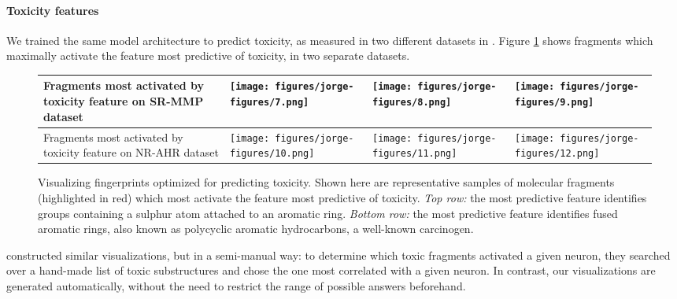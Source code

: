 \documentclass{article}
\newcommand{\citet}{\cite}
\begin{document}
\paragraph{Toxicity features}
We trained the same model architecture to predict toxicity, as measured in two different datasets in \citet{tox21}.
Figure \ref{fig:learned features toxicity} shows fragments which maximally activate the feature most predictive of toxicity, in two separate datasets.
\newcommand{\molfeaturetox}[2]{\texttt{[image: ../../DeepMoleculesData/experiments/2015-05-30-visualize-fps/5-toxic-diff-dataset/figures/fp\_\#1\_highlight\_\#2.pdf]}}\begin{figure}[h]
\begin{tabular}{>{\centering}m{1in} >{\centering}m{3.1cm} >{\centering}m{3.3cm} >{\centering\arraybackslash}m{3.1cm}}
Fragments most activated by toxicity feature on SR-MMP dataset
& \texttt{[image: figures/jorge-figures/7.png]} 
& \texttt{[image: figures/jorge-figures/8.png]}
& \texttt{[image: figures/jorge-figures/9.png]}\\
\midrule
Fragments most activated by toxicity feature on NR-AHR dataset
& \texttt{[image: figures/jorge-figures/10.png]} 
& \texttt{[image: figures/jorge-figures/11.png]}
& \texttt{[image: figures/jorge-figures/12.png]}\\
\end{tabular}
\vspace{-3mm}
\caption{Visualizing fingerprints optimized for predicting toxicity.
Shown here are representative samples of molecular fragments (highlighted in red) which most activate the feature most predictive of toxicity.
\emph{Top row:} the most predictive feature identifies groups containing a sulphur atom attached to an aromatic ring.
\emph{Bottom row:} the most predictive feature identifies fused aromatic rings, also known as polycyclic aromatic hydrocarbons, a well-known carcinogen.
}
\label{fig:learned features toxicity}
\end{figure}

\citet{unterthiner2015toxicity} constructed similar visualizations, but in a semi-manual way: to determine which toxic fragments activated a given neuron, they searched over a hand-made list of toxic substructures and chose the one most correlated with a given neuron.
In contrast, our visualizations are generated automatically, without the need to restrict the range of possible answers beforehand.
\end{document}
